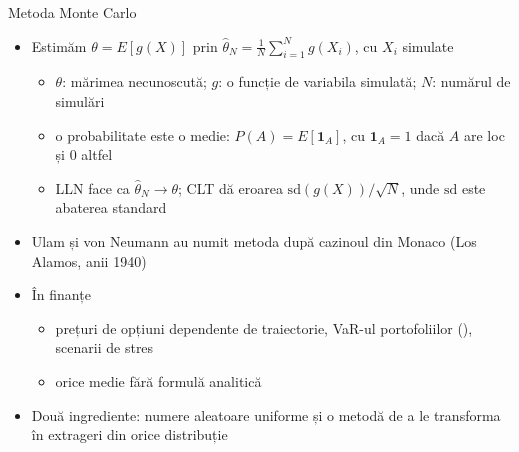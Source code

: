 \begin{frame}{Metoda Monte Carlo}
\itemsize{\footnotesize}
\begin{itemize}
    \item Estimăm $\theta = E[g(X)]$ prin $\hat\theta_N = \frac1N\sum_{i=1}^N g(X_i)$, cu $X_i$ simulate
    \begin{itemize}
        \item $\theta$: mărimea necunoscută; $g$: o funcție de variabila simulată; $N$: numărul de simulări
        \item o probabilitate este o medie: $P(A) = E[\mathbf{1}_A]$, cu $\mathbf{1}_A = 1$ dacă $A$ are loc și 0 altfel
        \item LLN face ca $\hat\theta_N \to \theta$; CLT dă eroarea $\text{sd}(g(X))/\sqrt{N}$, unde $\text{sd}$ este abaterea standard
    \end{itemize}
    \item Ulam și von Neumann au numit metoda după cazinoul din Monaco (Los Alamos, anii 1940) 
    \item În finanțe 
    \begin{itemize}
        \item prețuri de opțiuni dependente de traiectorie, VaR-ul portofoliilor (), scenarii de stres
        \item orice medie fără formulă analitică
    \end{itemize}
    \item Două ingrediente: numere aleatoare uniforme și o metodă de a le transforma în extrageri din orice distribuție
\end{itemize}
\end{frame}

